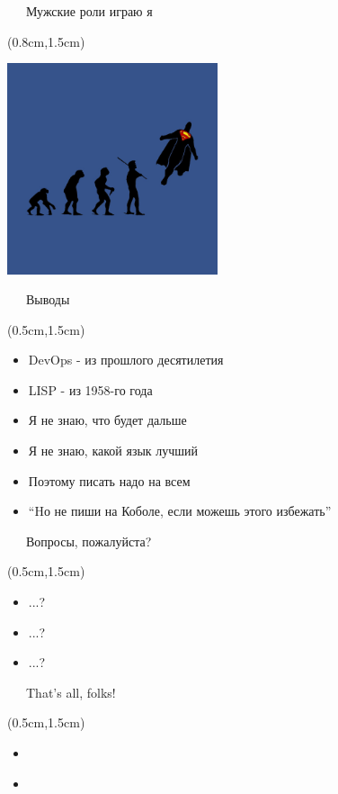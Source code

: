 \documentclass[xetex,18pt,aspectratio=43]{beamer}
\begin{document}
\begin{Large}
\begin{frame}{\ \ \ Мужские роли играю я}
\begin{textblock*}{\framewidth}(0.8cm,1.5cm)
\begin{minipage}{\textwidth}
  \centering
  \includegraphics[height=6.2cm]{img/superman}
\end{minipage}
\end{textblock*}
\end{frame}

\begin{frame}{\ \ \ Выводы}
\begin{textblock*}{\framewidth-0.8cm}(0.5cm,1.5cm)
\begin{itemize}
  \item DevOps - из прошлого десятилетия
  \item LISP - из 1958-го года
  \item Я не знаю, что будет дальше
  \item Я не знаю, какой язык лучший
  \item Поэтому писать надо на всем
  \item \enquote{Hо не пиши на Коболе, если можешь этого избежать}
\end{itemize}
\end{textblock*}
\end{frame}

\begin{frame}{\ \ \ Вопросы, пожалуйста?}
\begin{textblock*}{\framewidth-0.8cm}(0.5cm,1.5cm)
\begin{itemize}
  \item ...?
  \item ...?
  \item ...?
\end{itemize}
\end{textblock*}
\end{frame}

\begin{frame}{\ \ \ That's all, folks!}
\begin{textblock*}{\framewidth-0.8cm}(0.5cm,1.5cm)
\begin{itemize}
  \item \href{mailto:alex@cleartech.group}{\color{blue}{alex@cleartech.group}}
  \item \href{https://telegram.me/lhommequipleure}{\color{blue}{https://telegram.me/lhommequipleure}}
\end{itemize}
\end{textblock*}
\end{frame}
\end{Large}
\end{document}
